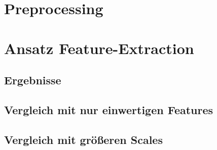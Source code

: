 \section{Preprocessing} 

\section{Ansatz Feature-Extraction} 

\subsection{Ergebnisse}

\subsection{Vergleich mit nur einwertigen Features}

\subsection{Vergleich mit größeren Scales}

